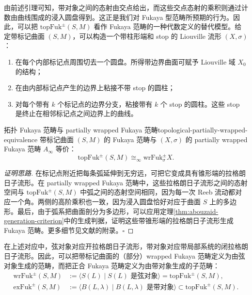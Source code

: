 由前述引理可知，带对象之间的态射由交点给出，而这些交点态射的乘积则通过计数由曲线围成的浸入圆盘得到。这正是我们对 Fukaya 型范畴所预期的行为。因此，可以把 $\mathrm{topFuk}^{\pm}(S,M)$ 看作 Fukaya 范畴的一种代数定义的替代模型。给定带标记曲面 $(S,M)$，可以构造一个带柱形端和 stop 的 Liouville 流形 $(X,\sigma)$：
\begin{enumerate}[label=(\roman*)]
  \item 在每个内部标记点周围切去一个圆盘。所得带边界曲面可赋予 Liouville 域 $X_0$ 的结构；
  \item 在由内部标记点产生的边界上粘接不带 stop 的圆柱；
  \item 对每个带有 $k$ 个标记点的边界分支，粘接带有 $k$ 个 stop 的圆柱。这些 stop 是终止在相邻标记点之间边界上的曲线。
\end{enumerate}

\begin{theorem}{拓扑 Fukaya 范畴与 partially wrapped Fukaya 范畴}{topological-partially-wrapped-equivalence}
带标记曲面 $(S,M)$ 的 Fukaya 范畴与 $(X,\sigma)$ 的 partially wrapped Fukaya 范畴 $A_\infty$ 等价：
\[
  \mathrm{topFuk}^{\pm}(S,M)\cong_\infty\mathrm{wrFuk}^{\pm}_{\sigma}X.
\]
\end{theorem}
\begin{proof}[证明思路]
在标记点附近把每条弧延伸到无穷远，可把它变成具有锥形端的拉格朗日子流形。在 partially wrapped Fukaya 范畴中，这些拉格朗日子流形之间的态射空间与 $\mathrm{topFuk}^{\pm}(S,M)$ 中弧之间的态射空间相同，因为每一次 Reeb 流动都对应一个角。两侧的高阶乘积也一致，因为浸入圆盘恰好对应于曲面 $S$ 上的多边形。最后，由于弧系把曲面剖分为多边形，可以应用定理\ref{thm:abouzaid-generation-criterion}中的生成判据，证明这些带锥形端的拉格朗日子流形生成 Fukaya 范畴。更多细节见文献的附录。\hfill$\square$
\end{proof}

在上述对应中，弦对象对应开拉格朗日子流形，带对象对应带局部系统的闭拉格朗日子流形。因此，可以把带标记曲面的（部分）wrapped Fukaya 范畴定义为由弦对象生成的范畴，而把正合 Fukaya 范畴定义为由带对象生成的子范畴：
\[
\begin{aligned}
  \mathrm{wrFuk}^{\pm}(S,M)&:=\langle S(L)\mid S(L)\text{ 是弦对象}\rangle
  =\mathrm{topFuk}^{\pm}(S,M),\\
  \mathrm{exFuk}^{\pm}(S,M)&:=\langle B(L,\lambda)\mid B(L,\lambda)\text{ 是带对象}\rangle
  \subset\mathrm{topFuk}^{\pm}(S,M).
\end{aligned}
\]


